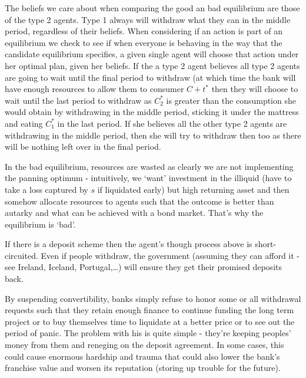 \documentclass[authoryear,11pt]{elsarticle}
\begin{document}
The beliefs we care about when comparing the good an bad equilibrium are those of the type 2 agents. Type 1 always will withdraw what they can in the middle period, regardless of their beliefs. When considering if an action is part of an equilibrium we check to see if when everyone is behaving in the way that the candidate equilibrium specifies, a given single agent will choose that action under her optimal plan, given her beliefs. If the a type 2 agent believes all type 2 agents are going to wait until the final period to withdraw (at which time the bank will have enough resources to allow them to consumer $C+{t}^{\ast}$ then they will choose to wait until the last period to withdraw as $C_{2}^{\ast}$ is greater than the consumption she would obtain by withdrawing in the middle period, sticking it under the mattress and eating $C_{1}^{\ast}$ in the last period. If she believes all the other type 2 agents are withdrawing in the middle period, then she will try to withdraw then too as there will be nothing left over in the final period.

In the bad equilibrium, resources are wasted as clearly we are not implementing the panning optimum - intuitively, we `want' investment in the illiquid (have to take a loss captured by $s$ if liquidated early) but high returning asset and then somehow allocate resources to agents such that the outcome is better than autarky and what can be achieved with a bond market. That's why the equilibrium is `bad'.

If there is a deposit scheme then the agent's though process above is short-circuited. Even if people withdraw, the government (assuming they can afford it - see Ireland, Iceland, Portugal,\ldots) will ensure they get their promised deposits back.

By suspending convertibility, banks simply refuse to honor some or all withdrawal requests such that they retain enough finance to continue funding the long term project or to buy themselves time to liquidate at a better price or to see out the period of panic. The problem with his is quite simple - they're keeping peoples' money from them and reneging on the deposit agreement. In some cases, this could cause enormous hardship and trauma that could also lower the bank's franchise value and worsen its reputation (storing up trouble for the future).
\end{document}
